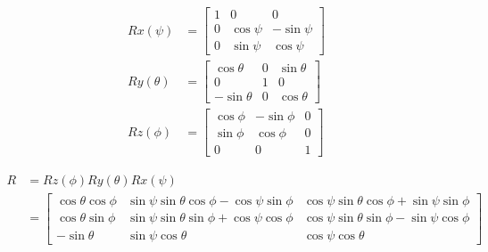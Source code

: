\documentclass{article}
\begin{document}
\begin{eqnarray}
    Rx(\psi) &= \begin{bmatrix}
      1 & 0          & 0           \\
      0 & \cos{\psi} & -\sin{\psi} \\
      0 & \sin{\psi} & \cos{\psi}
    \end{bmatrix} \\
    Ry(\theta) &= \begin{bmatrix}
      \cos{\theta}  & 0 & \sin{\theta} \\
      0             & 1 & 0            \\
      -\sin{\theta} & 0 & \cos{\theta}
    \end{bmatrix} \\
    Rz(\phi) &= \begin{bmatrix}
      \cos{\phi} & -\sin{\phi} & 0 \\
      \sin{\phi} & \cos{\phi}  & 0 \\
      0          &  0          & 1
    \end{bmatrix}
\end{eqnarray}

\begin{equation}
  \begin{split}
    R &= Rz(\phi)Ry(\theta)Rx(\psi) \\
    &= \begin{bmatrix}
      \cos{\theta}\cos{\phi} & \sin{\psi}\sin{\theta}\cos{\phi}−\cos{\psi}\sin{\phi} & \cos{\psi}\sin{\theta}\cos{\phi}+\sin{\psi}\sin{\phi} \\
      \cos{\theta}\sin{\phi} & \sin{\psi}\sin{\theta}\sin{\phi}+\cos{\psi}\cos{\phi} & \cos{\psi}\sin{\theta}\sin{\phi}−\sin{\psi}\cos{\phi} \\
      −\sin{\theta}          & \sin{\psi}\cos{\theta}                                & \cos{\psi}\cos{\theta}
    \end{bmatrix}
  \end{split}
\end{equation}
\end{document}
